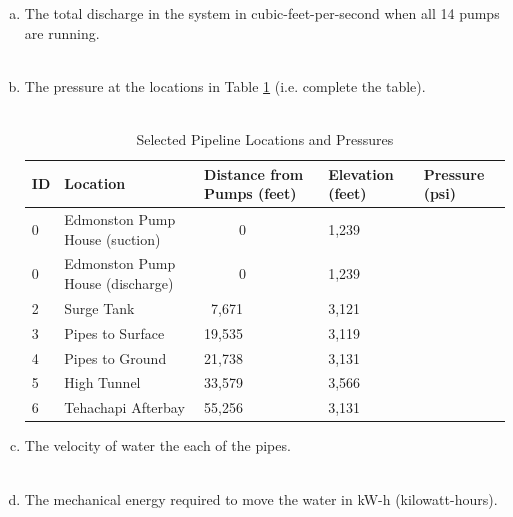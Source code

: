 \documentclass[12pt]{article}
\begin{document}
\begin{enumerate}
\begin{enumerate}[a)]
\item The total discharge in the system in cubic-feet-per-second when all 14 pumps are running. \\~\\
\item The pressure at the locations in Table \ref{tab:pressures} (i.e. complete the table). \\~\\
\begin{table}[h!]
   \centering
    \caption{Selected Pipeline Locations and Pressures }
    \begin{tabular}{p{0.5in}p{2in}p{1in}p{0.7in}p{0.7in}} %
\hline
\hline
ID & Location & Distance from Pumps (feet) & Elevation (feet) & Pressure (psi) \\
\hline
\hline
0& Edmonston Pump House (suction) & ~~~~~0  & 1,239 & ~~ \\
\hline
0& Edmonston Pump House (discharge)& ~~~~~0  & 1,239 & ~~ \\
\hline
2& Surge Tank & ~7,671 & 3,121 & ~~ \\
\hline
3& Pipes to Surface & 19,535 & 3,119 & ~~ \\
\hline
4& Pipes to Ground & 21,738 & 3,131 & ~~ \\
\hline
5& High Tunnel & 33,579 & 3,566 & ~~ \\
\hline
6& Tehachapi Afterbay & 55,256 & 3,131 & ~~ \\
\hline
   \end{tabular}
   \label{tab:pressures}
\end{table}
\item The velocity of water the each of the pipes. \\~\\
\item The mechanical energy required to move the water in kW-h  (kilowatt-hours). \\~\\

    \end{enumerate}


\end{enumerate}
\end{document}
